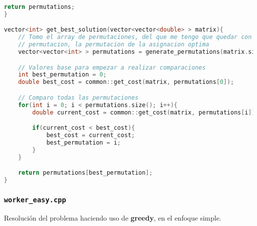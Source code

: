 \documentclass[10pt, a4paper]{article}
\theoremstyle{theorem-style}
\theoremstyle{theorem-style}
\theoremstyle{definition-style}
\theoremstyle{remark-style}
\theoremstyle{example-style}
\theoremstyle{definition-style}
\theoremstyle{remark-style}
\begin{document}
\begin{lstlisting}[language=C]
    return permutations;
}

vector<int> get_best_solution(vector<vector<double> > matrix){
    // Tomo el array de permutaciones, del que me tengo que quedar con solo una 
    // permutacion, la permutacion de la asignacion optima
    vector<vector<int> > permutations = generate_permutations(matrix.size());

    // Valores base para empezar a realizar comparaciones
    int best_permutation = 0;
    double best_cost = common::get_cost(matrix, permutations[0]);

    // Comparo todas las permutaciones
    for(int i = 0; i < permutations.size(); i++){
        double current_cost = common::get_cost(matrix, permutations[i]);

        if(current_cost < best_cost){
            best_cost = current_cost;
            best_permutation = i;
        }
    }

    return permutations[best_permutation];
}
\end{lstlisting}

\subsubsection*{\texttt{worker\_easy.cpp}}

Resolución del problema haciendo uso de \textbf{greedy}, en el enfoque simple.
\end{document}
